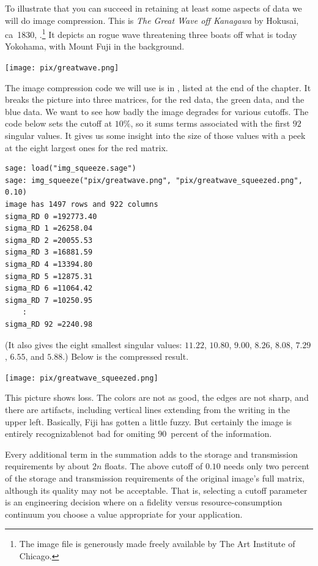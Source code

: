 To illustrate that you can succeed in retaining at least some aspects of data
we will do image compression.
This is \textit{The Great Wave off Kanagawa} by Hokusai, ca~1830,
\cite{wiki:GreatWave}.\footnote{%
  The image file is
  generously made freely available by The Art Institute of Chicago.}
It depicts an rogue wave threatening three boats off 
what is today Yokohama, with Mount Fuji in the background. 
\begin{center}
  \texttt{[image: pix/greatwave.png]} %
\end{center}

The image compression code we will use is in , 
listed at the end of the chapter.
It breaks the picture into three matrices, for the red data, the 
green data, and the blue data.
We want to see how badly the image degrades for various cutoffs.
The code below sets the cutoff at $10$\%,
so it sums terms associated
with the first $92$ singular values.
It gives us some insight into the size of those values
with a peek at the eight largest ones for the red matrix.
\begin{lstlisting}
sage: load("img_squeeze.sage")                                 
sage: img_squeeze("pix/greatwave.png", "pix/greatwave_squeezed.png", 0.10)
image has 1497 rows and 922 columns
sigma_RD 0 =192773.40
sigma_RD 1 =26258.04
sigma_RD 2 =20055.53
sigma_RD 3 =16881.59
sigma_RD 4 =13394.80
sigma_RD 5 =12875.31
sigma_RD 6 =11064.42
sigma_RD 7 =10250.95
    :
sigma_RD 92 =2240.98
\end{lstlisting}
(It also gives the eight smallest singular values:
  $11.22$,
  $10.80$,
  $9.00$,
  $8.26$,
  $8.08$,
  $7.29$,
  $6.55$, and
  $5.88$.)
Below is the compressed result.
\begin{center}
  \texttt{[image: pix/greatwave\_squeezed.png]}
\end{center}
This picture shows loss.
The colors are not as good, the edges are not sharp, and there are 
artifacts, including vertical lines extending from the writing in the 
upper left.
Basically, Fiji has gotten a little fuzzy.
But certainly the image is entirely recognizable\Dash not bad for omiting
$90$~percent of the information.

Every additional term in the summation
adds to the storage and transmission requirements by about $2n$ floats.
The above cutoff of $0.10$ needs 
only two percent of the storage
and transmission requirements of the original image's full matrix,
although its quality may not be acceptable.
That is, selecting a cutoff parameter is an engineering decision where
on a fidelity versus resource-consumption continuum 
you choose a value appropriate for your application.
 
